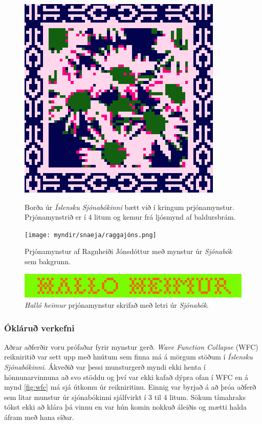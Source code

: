 \begin{figure}[p]
    \centering
    \begin{minipage}[b]{0.45\linewidth}
        \centering
        \includegraphics[width=.8\linewidth]{myndir/snaeja/bordi.png}
        \caption{Borða úr \textit{Íslensku Sjónabókinni} bætt við í kringum prjónamynstur. Prjónamynstrið er í 4 litum og kemur frá ljósmynd af baldursbrám.}
        \label{fig: sjonabok_bordi}
    \end{minipage}
    \hspace{0.05\linewidth} %
    \begin{minipage}[b]{0.45\linewidth}
        \centering
        \texttt{[image: myndir/snaeja/raggajóns.png]}
        \caption{Prjónamynstur af Ragnheiði Jónsdóttur með mynstur úr \textit{Sjónabók} sem bakgrunn.}
        \label{fig:raggajóns}
    \end{minipage}
\end{figure}

\begin{figure}[p]
    \centering
    \includegraphics[width=0.5\linewidth]{myndir/snaeja/hallo_heimur.png}
    \caption{\textit{Halló heimur} prjónamynstur skrifað með letri úr \textit{Sjónabók}.}
    \label{fig:hallo_heimur}
\end{figure}

\subsubsection{Ókláruð verkefni}
Aðrar aðferðir voru prófaðar fyrir mynstur gerð. \textit{Wave Function Collapse} (WFC) reikniritið var sett upp með hnútum sem finna má á mörgum stöðum í \textit{Íslensku Sjónabókinni}. Ákveðið var þessi munsturgerð myndi ekki henta í hönnunarvinnuna að svo stöddu og því var ekki kafað dýpra ofan í WFC en á mynd \ref{fig:wfc} má sjá útkomu úr reikniritinu. Einnig var byrjað á að þróa aðferð sem litar munstur úr sjónabókinni sjálfvirkt í 3 til 4 litum. Sökum tímahraks tókst ekki að klára þá vinnu en var hún komin nokkuð áleiðis og mætti halda áfram með hana síðar.

